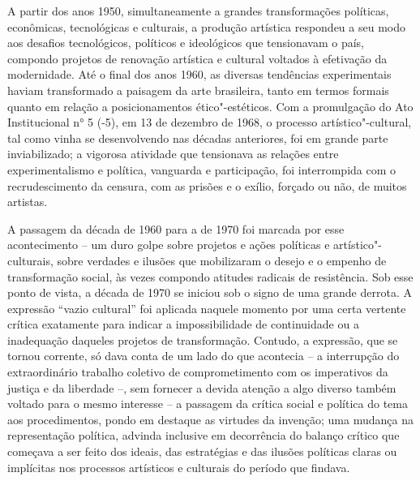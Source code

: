 \pagebreak
\thispagestyle{empty}

\movetooddpage

A partir dos anos 1950, simultaneamente a grandes transformações
políticas, econômicas, tecnológicas e culturais, a produção artística
respondeu a seu modo aos desafios tecnológicos, políticos e ideológicos
que tensionavam o país, compondo projetos de renovação artística e
cultural voltados à efetivação da modernidade. Até o final dos anos
1960, as diversas tendências experimentais haviam transformado a
paisagem da arte brasileira, tanto em termos formais quanto em relação a
posicionamentos ético"-estéticos. Com a promulgação do Ato Institucional
n° 5 (-5), em 13 de dezembro de 1968, o processo artístico"-cultural, tal como
vinha se desenvolvendo nas décadas anteriores, foi em grande parte
inviabilizado; a vigorosa atividade que tensionava as relações entre
experimentalismo e política, vanguarda e participação, foi interrompida
com o recrudescimento da censura, com as prisões e o exílio, forçado ou
não, de muitos artistas.

A passagem da década de 1960 para a de 1970 foi marcada por esse
acontecimento -- um duro golpe sobre projetos e ações políticas e
artístico"-culturais, sobre verdades e ilusões que mobilizaram o desejo e
o empenho de transformação social, às vezes compondo atitudes radicais
de resistência. Sob esse ponto de vista, a década de 1970 se iniciou sob
o signo de uma grande derrota. A expressão ``vazio cultural'' foi aplicada
naquele momento por uma certa vertente crítica exatamente para indicar a
impossibilidade de continuidade ou a inadequação daqueles projetos de
transformação. Contudo, a expressão, que se tornou corrente, só dava
conta de um lado do que acontecia -- a interrupção do extraordinário
trabalho coletivo de comprometimento com os imperativos da justiça e da
liberdade --, sem fornecer a devida atenção a algo diverso também voltado
para o mesmo interesse -- a passagem da crítica social e política do
tema aos procedimentos, pondo em destaque as virtudes da invenção; uma
mudança na representação política, advinda inclusive em decorrência do
balanço crítico que começava a ser feito dos ideais, das estratégias e
das ilusões políticas claras ou implícitas nos processos artísticos e
culturais do período que findava.

